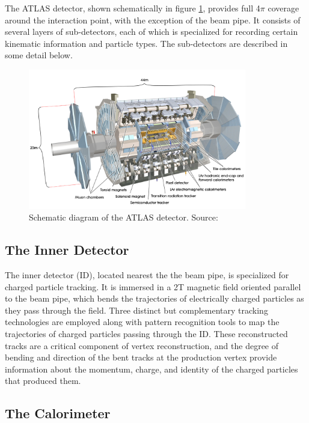 \documentclass[12pt]{article}
\begin{document}
The ATLAS detector, shown schematically in figure \ref{fig:detector}, provides full 4$\pi$ coverage around the interaction point, with the exception of the beam pipe. It consists of several layers of sub-detectors, each of which is specialized for recording certain kinematic information and particle types. The sub-detectors are described in some detail below. 

\begin{figure}[H]
	\centering
	\includegraphics[width=0.85\textwidth]{figures/detector.jpg}
	\caption[]{Schematic diagram of the ATLAS detector. Source: \cite{atlas}}
	\label{fig:detector}
\end{figure}

\subsection{The Inner Detector}

The inner detector (ID), located nearest the the beam pipe, is specialized for charged particle tracking. It is immersed in a 2T magnetic field oriented parallel to the beam pipe, which bends the trajectories of electrically charged particles as they pass through the field. Three distinct but complementary tracking technologies are employed along with pattern recognition tools to map the trajectories of charged particles passing through the ID. These reconstructed tracks are a critical component of vertex reconstruction, and the degree of bending and direction of the bent tracks at the production vertex provide information about the momentum, charge, and identity of the charged particles that produced them. 

\subsection{The Calorimeter}
\end{document}
